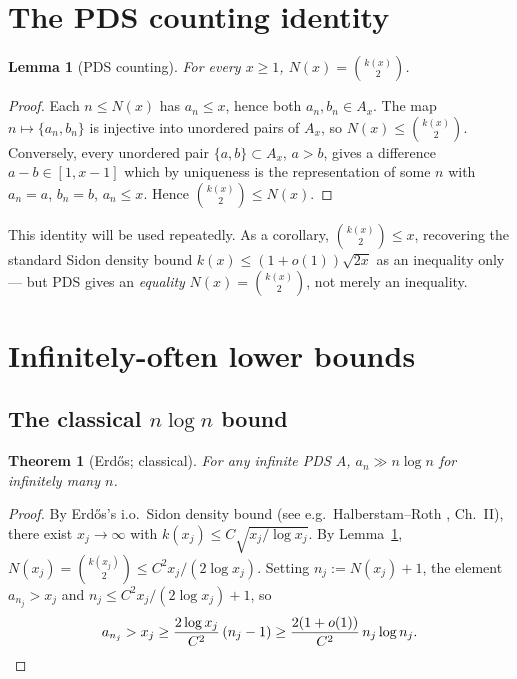 \documentclass[11pt]{article}
\newtheorem{theorem}{Theorem}
\newtheorem{lemma}{Lemma}
\begin{document}
\section{The PDS counting identity}\label{sec:counting}

\begin{lemma}[PDS counting]\label{lem:pds-count}
For every $x \geq 1$, $N(x) = \binom{k(x)}{2}$.
\end{lemma}

\begin{proof}
Each $n \leq N(x)$ has $a_n \leq x$, hence both $a_n, b_n \in A_x$. The
map $n \mapsto \{a_n, b_n\}$ is injective into unordered pairs of $A_x$,
so $N(x) \leq \binom{k(x)}{2}$. Conversely, every unordered pair
$\{a, b\} \subset A_x$, $a > b$, gives a difference $a - b \in [1, x-1]$
which by uniqueness is the representation of some $n$ with $a_n = a$,
$b_n = b$, $a_n \leq x$. Hence $\binom{k(x)}{2} \leq N(x)$.
\end{proof}

This identity will be used repeatedly. As a corollary,
$\binom{k(x)}{2} \leq x$, recovering the standard Sidon density bound
$k(x) \leq (1 + o(1))\sqrt{2x}$ as an inequality only --- but PDS gives
an \emph{equality} $N(x) = \binom{k(x)}{2}$, not merely an inequality.

\section{Infinitely-often lower bounds}\label{sec:lb}

\subsection{The classical $n \log n$ bound}

\begin{theorem}[Erd\H{o}s; classical]\label{thm:nlogn}
For any infinite PDS $A$, $a_n \gg n \log n$ for infinitely many $n$.
\end{theorem}

\begin{proof}
By Erd\H{o}s's i.o.\ Sidon density bound (see e.g.\ Halberstam--Roth
\cite{HaRo66}, Ch.~II), there exist $x_j \to \infty$ with
$k(x_j) \leq C \sqrt{x_j / \log x_j}$. By Lemma~\ref{lem:pds-count},
$N(x_j) = \binom{k(x_j)}{2} \leq C^2 x_j / (2 \log x_j)$. Setting
$n_j := N(x_j) + 1$, the element $a_{n_j} > x_j$ and
$n_j \leq C^2 x_j/(2\log x_j) + 1$, so
\[
   a_{n_j} > x_j \geq \frac{2 \log x_j}{C^2}\,(n_j - 1)
         \geq \frac{2(1+o(1))}{C^2}\, n_j \log n_j.\qedhere
\]
\end{proof}
\end{document}
